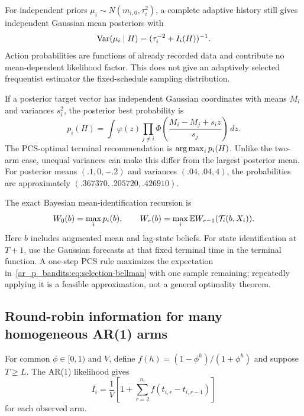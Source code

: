For independent priors $\mu_i\sim N(m_{i,0},\tau_i^2)$, a complete adaptive history still gives independent Gaussian mean posteriors with
\begin{equation}
\operatorname{Var}(\mu_i\mid H)=(\tau_i^{-2}+I_i(H))^{-1}.
\end{equation}
Action probabilities are functions of already recorded data and contribute no mean-dependent likelihood factor. This does not give an adaptively selected frequentist estimator the fixed-schedule sampling distribution.

If a posterior target vector has independent Gaussian coordinates with means $M_i$ and variances $s_i^2$, the posterior best probability is
\begin{equation}
p_i(H)=\int\varphi(z)\prod_{j\ne i}
\Phi\left(\frac{M_i-M_j+s_iz}{s_j}\right)\,dz.
\label{ar_p_bandits:eq:posterior-pcs}
\end{equation}
The PCS-optimal terminal recommendation is $\operatorname*{arg\,max}_i p_i(H)$. Unlike the two-arm case, unequal variances can make this differ from the largest posterior mean. For posterior means $(.1,0,-.2)$ and variances $(.04,.04,4)$, the probabilities are approximately $(.367370,.205720,.426910)$.

The exact Bayesian mean-identification recursion is
\begin{equation}
W_0(b)=\max_i p_i(b),\qquad
W_r(b)=\max_i\mathbb E W_{r-1}(\mathcal T_i(b,X_i)).
\label{ar_p_bandits:eq:selection-bellman}
\end{equation}
Here $b$ includes augmented mean and lag-state beliefs. For state identification at $T+1$, use the Gaussian forecasts at that fixed terminal time in the terminal function. A one-step PCS rule maximizes the expectation in~\eqref{ar_p_bandits:eq:selection-bellman} with one sample remaining; repeatedly applying it is a feasible approximation, not a general optimality theorem.

\subsection{Round-robin information for many homogeneous AR(1) arms}
For common $\phi\in[0,1)$ and $V$, define $f(h)=(1-\phi^h)/(1+\phi^h)$ and suppose $T\geq L$. The AR(1) likelihood gives
\[
I_i=\frac1V\left[1+\sum_{r=2}^{n_i}f(t_{i,r}-t_{i,r-1})\right]
\]
for each observed arm.

